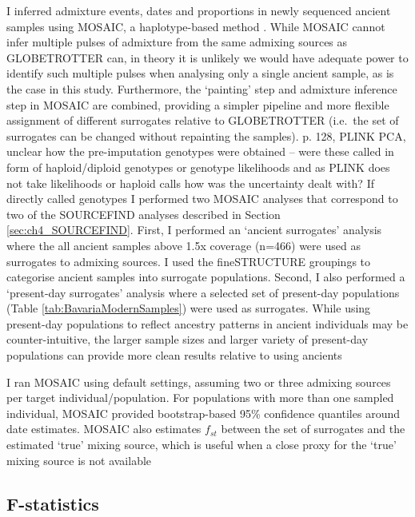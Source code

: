 I inferred admixture events, dates and proportions in newly sequenced ancient samples using MOSAIC, a haplotype-based method \cite{MOSAIC_2019}. While MOSAIC cannot infer multiple pulses of admixture from the same admixing sources as GLOBETROTTER \cite{Hellenthal2014} can, in theory it is unlikely we would have adequate power to identify such multiple pulses when analysing only a single ancient sample, as is the case in this study. Furthermore, the `painting' step and admixture inference step in MOSAIC are combined, providing a simpler pipeline and more flexible assignment of different surrogates relative to GLOBETROTTER (i.e.\ the set of surrogates can be changed without repainting the samples).
p. 128, PLINK PCA, unclear how the pre-imputation genotypes were obtained – were
these called in form of haploid/diploid genotypes or genotype likelihoods and as PLINK
does not take likelihoods or haploid calls how was the uncertainty dealt with? If directly
called genotypes
I performed two MOSAIC analyses that correspond to two of the SOURCEFIND analyses described in Section \ref{sec:ch4_SOURCEFIND}. First, I performed an `ancient surrogates' analysis where the all ancient samples above 1.5x coverage (n=466) were used as surrogates to admixing sources. I used the fineSTRUCTURE groupings to categorise ancient samples into surrogate populations. Second, I also performed a `present-day surrogates' analysis where a selected set of present-day populations (Table \ref{tab:BavariaModernSamples}) were used as surrogates. While using present-day populations to reflect ancestry patterns in ancient individuals may be counter-intuitive, the larger sample sizes and larger variety of present-day populations can provide more clean results relative to using ancients

I ran MOSAIC using default settings, assuming two or three admixing sources per target individual/population. For populations with more than one sampled individual, MOSAIC provided bootstrap-based 95\% confidence quantiles around date estimates. MOSAIC also estimates $f_{st}$ between the set of surrogates and the estimated `true' mixing source, which is useful when a close proxy for the `true' mixing source is not available

\subsection{F-statistics}

